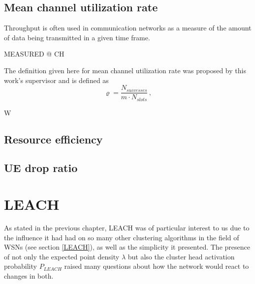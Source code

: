 \subsection{Mean channel utilization rate}
Throughput is often used in communication networks as a measure of the amount of data being transmitted in a given time frame. 

MEASURED @ CH


The definition given here for mean channel utilization rate was proposed by this work's supervisor and is defined as
\begin{equation}\label{eq:TP}
\varrho = \frac{N_{successes}}{m\cdot N_{slots}}\,,
\end{equation}

W
\subsection{Resource efficiency}
\subsection{UE drop ratio}

\section{LEACH}
As stated in the previous chapter, LEACH was of particular interest to us due to the influence it had had on so many other clustering algorithms in the field of WSNs (see section \ref{LEACH}), as well as the simplicity it presented. The presence of not only the expected point density $\lambda$ but also the cluster head activation probability $P_{LEACH}$ raised many questions about how the network would react to changes in both. 

